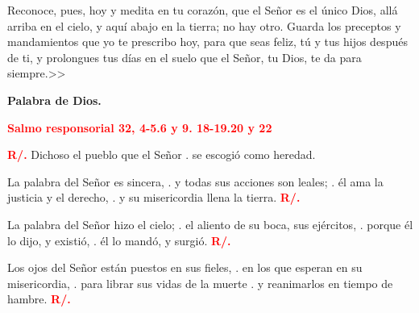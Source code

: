 \documentclass[12pt, letterpaper, spanish]{report}
\begin{document}
Reconoce, pues, hoy y medita en tu coraz\'on, que el Se\~nor es el \'unico Dios, all\'a arriba en el 
cielo, y aqu\'i abajo en la tierra; no hay otro. Guarda los preceptos y mandamientos que yo te 
prescribo hoy, para que seas feliz, t\'u y tus hijos despu\'es de ti, y prolongues tus d\'ias en el 
suelo que el Se\~nor, tu Dios, te da para siempre.>> \newline

{\bfseries Palabra de Dios.} \newline

\Large {\bfseries \textcolor{red}{Salmo responsorial \hspace{1cm} 32, 4-5.6 y 9. 18-19.20 y 22}} \newline

\Large {\bfseries \textcolor{red}{R/.}} \hspace{1cm} Dichoso el pueblo que el Se\~nor \newline
. \hspace{3cm} se escogi\'o como heredad. \newline

\hspace{2cm} La palabra del Se\~nor es sincera, \newline
. \hspace{2.5cm} y todas sus acciones son leales; \newline
. \hspace{2.5cm} \'el ama la justicia y el derecho, \newline
. \hspace{2.5cm} y su misericordia llena la tierra. \hspace{1cm} {\bfseries \textcolor{red}{R/.}} \newline

\hspace{2cm} La palabra del Se\~nor hizo el cielo; \newline
. \hspace{2.5cm} el aliento de su boca, sus ej\'ercitos, \newline
. \hspace{2.5cm} porque \'el lo dijo, y existi\'o, \newline
. \hspace{2.5cm} \'el lo mand\'o, y surgi\'o. \hspace{1cm} {\bfseries \textcolor{red}{R/.}} \newline

\hspace{2cm} Los ojos del Se\~nor est\'an puestos en sus fieles, \newline
. \hspace{2.5cm}  en los que esperan en su misericordia, \newline
. \hspace{2.5cm}  para librar sus vidas de la muerte \newline
. \hspace{2.5cm}  y reanimarlos en tiempo de hambre. \hspace{1cm} {\bfseries \textcolor{red}{R/.}} \newline
\end{document}
